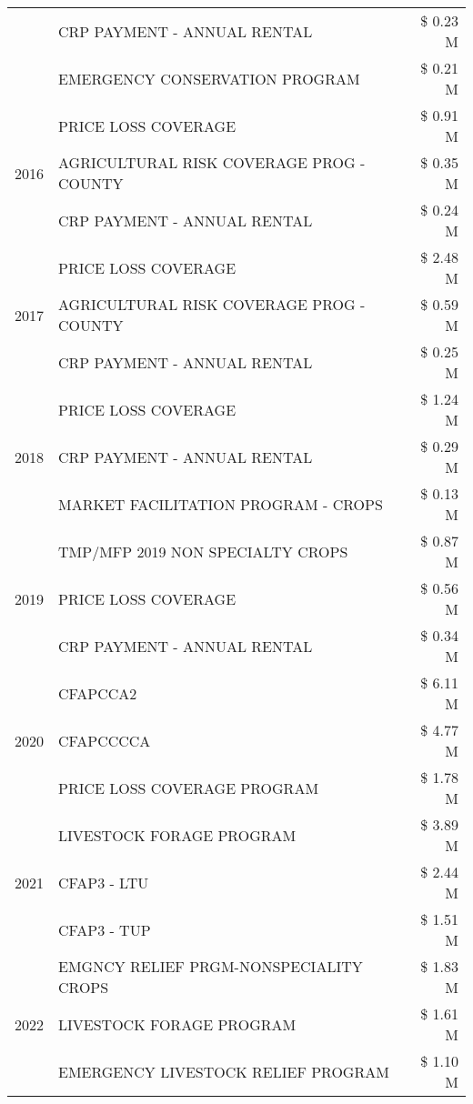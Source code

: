 \begin{tabular}{llr}
 & CRP PAYMENT - ANNUAL RENTAL & \$ 0.23 M \\
 & EMERGENCY CONSERVATION PROGRAM & \$ 0.21 M \\
\cline{1-3}
\multirow[t]{3}{*}{2016} & PRICE LOSS COVERAGE & \$ 0.91 M \\
 & AGRICULTURAL RISK COVERAGE PROG - COUNTY & \$ 0.35 M \\
 & CRP PAYMENT - ANNUAL RENTAL & \$ 0.24 M \\
\cline{1-3}
\multirow[t]{3}{*}{2017} & PRICE LOSS COVERAGE & \$ 2.48 M \\
 & AGRICULTURAL RISK COVERAGE PROG - COUNTY & \$ 0.59 M \\
 & CRP PAYMENT - ANNUAL RENTAL & \$ 0.25 M \\
\cline{1-3}
\multirow[t]{3}{*}{2018} & PRICE LOSS COVERAGE & \$ 1.24 M \\
 & CRP PAYMENT - ANNUAL RENTAL & \$ 0.29 M \\
 & MARKET FACILITATION PROGRAM - CROPS & \$ 0.13 M \\
\cline{1-3}
\multirow[t]{3}{*}{2019} & TMP/MFP 2019 NON SPECIALTY CROPS & \$ 0.87 M \\
 & PRICE LOSS COVERAGE & \$ 0.56 M \\
 & CRP PAYMENT - ANNUAL RENTAL & \$ 0.34 M \\
\cline{1-3}
\multirow[t]{3}{*}{2020} & CFAPCCA2 & \$ 6.11 M \\
 & CFAPCCCCA & \$ 4.77 M \\
 & PRICE LOSS COVERAGE PROGRAM & \$ 1.78 M \\
\cline{1-3}
\multirow[t]{3}{*}{2021} & LIVESTOCK FORAGE PROGRAM & \$ 3.89 M \\
 & CFAP3 - LTU & \$ 2.44 M \\
 & CFAP3 - TUP & \$ 1.51 M \\
\cline{1-3}
\multirow[t]{3}{*}{2022} & EMGNCY RELIEF PRGM-NONSPECIALITY CROPS & \$ 1.83 M \\
 & LIVESTOCK FORAGE PROGRAM & \$ 1.61 M \\
 & EMERGENCY LIVESTOCK RELIEF PROGRAM & \$ 1.10 M \\
\cline{1-3}
\bottomrule
\end{tabular}
